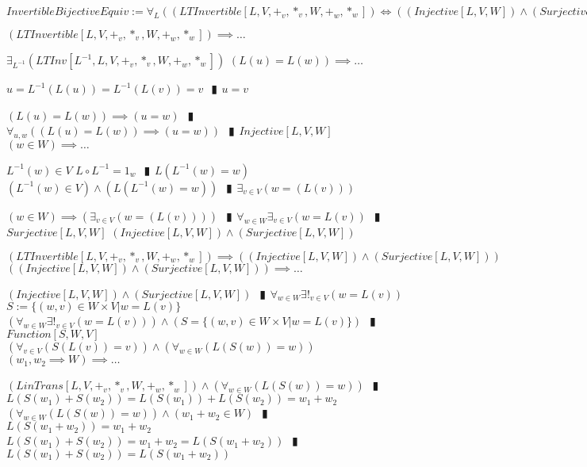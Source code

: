 \documentclass{book}
\newcommand{\abr}{:=}
\newcommand{\pipe}{$\phantom{(}\vrectangleblack\phantom{)}$}
\newcommand{\pr}[1]{\left(#1\right)}
\begin{document}
$InvertibleBijectiveEquiv \abr \forall_{L}\pr{(LTInvertible[L, V, +_v, *_v, W, +_w, *_w]) \iff \pr{(Injective[L, V, W]) \land (Surjective[L, V, W])}}$
\begin{enumerate}
  \lit $(LTInvertible[L, V, +_v, *_v, W, +_w, *_w]) \implies \ldots$
  \begin{enumerate}
    \lit $\exists_{L^{-1}}(LTInv[L^{-1}, L, V, +_v, *_v, W, +_w, *_w])$
    \lit $\pr{L(u) = L(w)} \implies \ldots$
    \begin{enumerate}
      \lit $u = L^{-1}\pr{L(u)} = L^{-1}\pr{L(v)} = v$ \pipe $u = v$
    \end{enumerate}
    \lit $\pr{L(u) = L(w)} \implies (u = w)$ \pipe $\forall_{u, w}\pr{\pr{L(u) = L(w)} \implies (u = w)}$ \pipe $Injective[L, V, W]$
    \lit $(w \in W) \implies \ldots$
    \begin{enumerate}
      \lit $L^{-1}(w) \in V$
      \lit $L \circ L^{-1} = 1_w$ \pipe $L\pr{L^{-1}(w) = w}$
      \lit $\pr{L^{-1}(w) \in V} \land \pr{L\pr{L^{-1}(w) = w}}$ \pipe $\exists_{v \in V}\pr{w = \pr{L(v)}}$
    \end{enumerate}
    \lit $(w \in W) \implies \pr{\exists_{v \in V}\pr{w = \pr{L(v)}}}$ \pipe $\forall_{w \in W} \exists_{v \in V}\pr{w = L(v)}$ \pipe $Surjective[L, V, W]$
    \lit $(Injective[L, V, W]) \land (Surjective[L, V, W])$
  \end{enumerate}
  \lit $(LTInvertible[L, V, +_v, *_v, W, +_w, *_w]) \implies \pr{(Injective[L, V, W]) \land (Surjective[L, V, W])}$
  \lit $\pr{(Injective[L, V, W]) \land (Surjective[L, V, W])} \implies \ldots$
  \begin{enumerate}
    \lit $(Injective[L, V, W]) \land (Surjective[L, V, W])$ \pipe $\forall_{w \in W} \exists!_{v \in V}\pr{w = L(v)}$
    \lit $S \abr \{(w, v) \in W \times V | w = L(v)\}$
    \lit $\pr{\forall_{w \in W} \exists!_{v \in V}\pr{w = L(v)}} \land \pr{S = \{(w, v) \in W \times V | w = L(v)\}}$ \pipe $Function[S, W, V]$
    \lit $\pr{\forall_{v \in V}\pr{S\pr{L(v)} = v}} \land \pr{\forall_{w \in W}\pr{L\pr{S(w)} = w}}$
    \lit $(w_1, w_2 \implies W) \implies \ldots$
    \begin{enumerate}
      \lit $(LinTrans[L, V, +_v, *_v, W, +_w, *_w]) \land \pr{\forall_{w \in W}\pr{L\pr{S(w)} = w}}$ \pipe $L\pr{S(w_1) + S(w_2)} = L\pr{S(w_1)} + L\pr{S(w_2)} = w_1 + w_2$
      \lit $\pr{\forall_{w \in W}\pr{L\pr{S(w)} = w}} \land (w_1 + w_2 \in W)$ \pipe $L\pr{S(w_1 + w_2)} = w_1 + w_2$
      \lit $L\pr{S(w_1) + S(w_2)} = w_1 + w_2 = L\pr{S(w_1 + w_2)}$ \pipe $L\pr{S(w_1) + S(w_2)} = L\pr{S(w_1 + w_2)}$

\end{enumerate}
\end{enumerate}
\end{enumerate}
\end{document}

